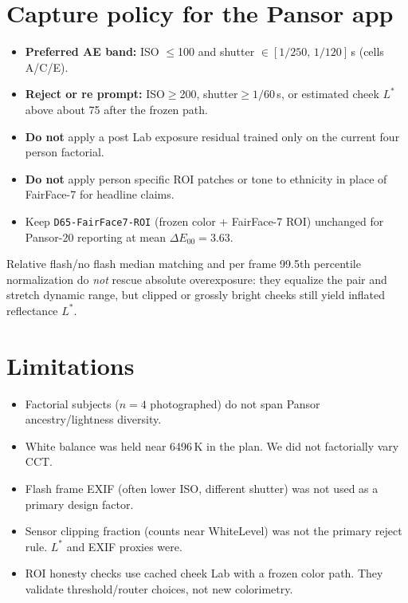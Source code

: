 \documentclass[11pt]{article}
\newcommand{\deee}{\ensuremath{\Delta E_{00}}}
\newcommand{\pipename}{\texttt{D65-FairFace7-ROI}}
\begin{document}
\section{Capture policy for the Pansor app}

\begin{itemize}[leftmargin=*]
  \item \textbf{Preferred AE band:} ISO $\le$100 and shutter $\in[1/250,\,1/120]$\,s (cells A/C/E).
  \item \textbf{Reject or re prompt:} ISO$\ge$200, shutter$\ge 1/60$\,s, or estimated cheek $L^*$ above about 75 after the frozen path.
  \item \textbf{Do not} apply a post Lab exposure residual trained only on the current four person factorial.
  \item \textbf{Do not} apply person specific ROI patches or tone to ethnicity in place of FairFace-7 for headline claims.
  \item Keep \pipename{} (frozen color + FairFace-7 ROI) unchanged for Pansor-20 reporting at mean $\deee=\num{3.63}$.
\end{itemize}

Relative flash/no flash median matching and per frame 99.5th percentile normalization do \emph{not} rescue absolute overexposure: they equalize the pair and stretch dynamic range, but clipped or grossly bright cheeks still yield inflated reflectance $L^*$.

\section{Limitations}

\begin{itemize}[leftmargin=*]
  \item Factorial subjects ($n=4$ photographed) do not span Pansor ancestry/lightness diversity.
  \item White balance was held near 6496\,K in the plan. We did not factorially vary CCT.
  \item Flash frame EXIF (often lower ISO, different shutter) was not used as a primary design factor.
  \item Sensor clipping fraction (counts near WhiteLevel) was not the primary reject rule. $L^*$ and EXIF proxies were.
  \item ROI honesty checks use cached cheek Lab with a frozen color path. They validate threshold/router choices, not new colorimetry.
\end{itemize}
\end{document}

